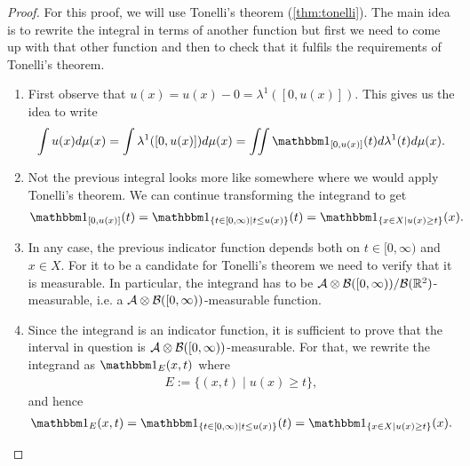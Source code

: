 \begin{proof}
	For this proof, we will use Tonelli's theorem (\autoref{thm:tonelli}). The main idea is to rewrite the integral in terms of another function but first we need to come up with that other function and then to check that it fulfils the requirements of Tonelli's theorem.
	
	\begin{enumerate}
		\item First observe that $u(x) = u(x) - 0 = \lambda^1([0, u(x)])$. This gives us the idea to write
		\begin{align*}
			\int u(x) d\mu(x)
			= \int \lambda^1([0, u(x)]) d\mu(x)
			= \iint \ind_{[0, u(x)]}(t)d\lambda^1(t)d\mu(x).
		\end{align*}
		
		\item Not the previous integral looks more like somewhere where we would apply Tonelli's theorem. We can continue transforming the integrand to get
		\begin{align*}
			\ind_{[0, u(x)]}(t)
			= \ind_{\{t \in [0, \infty) \mid t \leq u(x)\}}(t)
			= \ind_{\{x \in X \mid u(x) \geq t\}}(x).
		\end{align*}
		
		\item In any case, the previous indicator function depends both on $t \in [0, \infty)$ and $x \in X$. For it to be a candidate for Tonelli's theorem we need to verify that it is measurable. In particular, the integrand has to be $\mathcal{A} \otimes \mathcal{B}([0, \infty))/\mathcal{B}(\mathbb{R}^2)$-measurable, i.e. a $\mathcal{A} \otimes \mathcal{B}([0, \infty))$-measurable function.
		
		\item Since the integrand is an indicator function, it is sufficient to prove that the interval in question is $\mathcal{A} \otimes \mathcal{B}([0, \infty))$-measurable. For that, we rewrite the integrand as $\ind_E(x, t)$ where
		\begin{align*}
			E := \{(x, t) \mid u(x) \geq t\},
		\end{align*}
		and hence
		\begin{align*}
			\ind_E(x, t)
			= \ind_{\{t \in [0, \infty) \mid t \leq u(x)\}}(t)
			= \ind_{\{x \in X \mid u(x) \geq t\}}(x).
		\end{align*}
		

\end{enumerate}
\end{proof}
